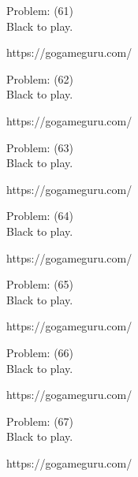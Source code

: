 \documentclass[11pt]{article}
\begin{document}
\begin{minipage}[t]{0.5\textwidth}
  {\centering
  
  Problem: (61)\\
  Black to play.

https://gogameguru.com/\\
  }
\end{minipage}
\begin{minipage}[t]{0.5\textwidth}
  {\centering
  
  Problem: (62)\\
  Black to play.

https://gogameguru.com/\\
  }
\end{minipage}
\begin{minipage}[t]{0.5\textwidth}
  {\centering
  
  Problem: (63)\\
  Black to play.

https://gogameguru.com/\\
  }
\end{minipage}
\begin{minipage}[t]{0.5\textwidth}
  {\centering
  
  Problem: (64)\\
  Black to play.

https://gogameguru.com/\\
  }
\end{minipage}
\begin{minipage}[t]{0.5\textwidth}
  {\centering
  
  Problem: (65)\\
  Black to play.

https://gogameguru.com/\\
  }
\end{minipage}
\begin{minipage}[t]{0.5\textwidth}
  {\centering
  
  Problem: (66)\\
  Black to play.

https://gogameguru.com/\\
  }
\end{minipage}
\begin{minipage}[t]{0.5\textwidth}
  {\centering
  
  Problem: (67)\\
  Black to play.

https://gogameguru.com/\\
  }
\end{minipage}
\end{document}
